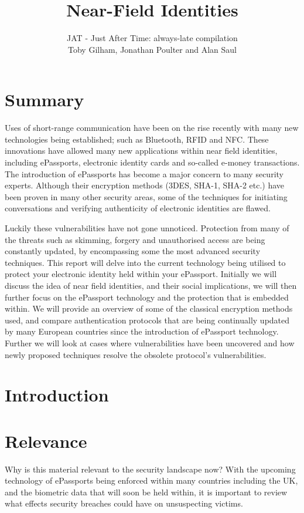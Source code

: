 \documentclass[12pt]{article}
\title{Near-Field Identities}
\author{JAT - Just After Time: always-late compilation\\Toby Gilham, Jonathan Poulter and Alan Saul}
\date{}                                           %
\begin{document}
\maketitle
\newpage
\section{Summary}
{\color{red}{Executive summary of not more than one page, which summarises the content of the report.}}

Uses of short-range communication have been on the rise recently with many new technologies being established; such as Bluetooth, RFID and NFC. These innovations have allowed many new applications within near field identities, including ePassports, electronic identity cards and so-called e-money transactions. The introduction of ePassports has become a major concern to many security experts. Although their encryption methods (3DES, SHA-1, SHA-2 etc.) have been proven in many other security areas, some of the techniques for initiating conversations and verifying authenticity of electronic identities are flawed.

Luckily these vulnerabilities have not gone unnoticed. Protection from many of the threats such as skimming, forgery and unauthorised access are being constantly updated, by encompassing some the most advanced security techniques. 
This report will delve into the current technology being utilised to protect your electronic identity held within your ePassport. Initially we will discuss the idea of near field identities, and their social implications, we will then further focus on the ePassport technology and the protection that is embedded within. We will provide an overview of some of the classical encryption methods used, and compare authentication protocols that are being continually updated by many European countries since the introduction of ePassport technology. Further we will look at cases where vulnerabilities have been uncovered and how newly proposed techniques resolve the obsolete protocol's vulnerabilities.

\section{Introduction}
{\color{red}{Introduce the idea of near field identities, where they are likely to lead 
TODO}}

\section{Relevance}
Why is this material relevant to the security landscape now?
With the upcoming technology of ePassports being enforced within many countries including the UK, and the biometric data that will soon be held within, it is important to review what effects security breaches could have on unsuspecting victims.
\end{document}
